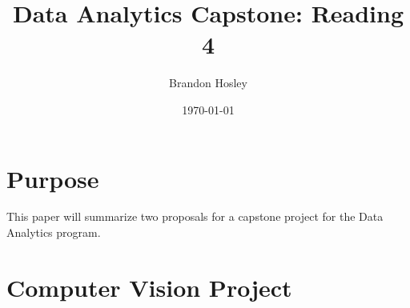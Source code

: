 \documentclass[]{article}
\title{Data Analytics Capstone: Reading 4}
\author{Brandon Hosley}
\date{\today}
\begin{document}
	\maketitle
	
\section{Purpose} 

This paper will summarize two proposals for a capstone project for the Data Analytics program.

\section{Computer Vision Project}



\clearpage


\end{document}
